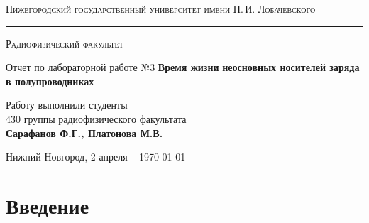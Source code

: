 \documentclass[a4paper,14pt]{extarticle}
\def\labauthors{Сарафанов Ф.Г., Платонова М.В.}
\def\labnumber{3}
\begin{document}
\begin{titlepage}
\begin{center}
{\small\textsc{Нижегородский государственный университет имени Н.\,И. Лобачевского}}
\vskip 2pt \hrule \vskip 3pt
{\small\textsc{Радиофизический факультет}}

\vfill


{{\large Отчет по лабораторной работе №\labnumber}\vskip 12pt {\Huge \bfseries Время жизни}\vskip 0pt {\LARGE \bfseries неосновных носителей заряда\\[0.2em] в полупроводниках}}

  
\vspace{2cm}
{\large Работу выполнили студенты \\[-0.25em] 430 группы радиофизического факультата \\[0.5em] {\Large \bfseries \labauthors}}



\end{center}

\vfill
  
  
  
\begin{center}
  {Нижний Новгород, 2 апреля -- \today}
\end{center}

\end{titlepage}
\tableofcontents
\newpage


\section*{Введение}
\end{document}
